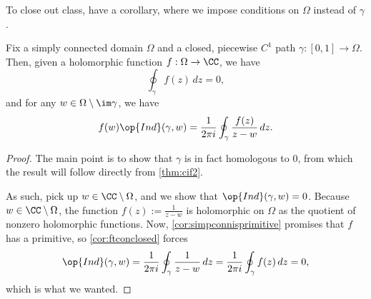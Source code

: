 To close out class, have a corollary, where we impose conditions on $\Omega$ instead of $\gamma$.
\begin{corollary} \label{cor:cifhomotopy}
	Fix a simply connected domain $\Omega$ and a closed, piecewise $C^1$ path $\gamma:[0,1]\to\Omega$. Then, given a holomorphic function $f:\Omega\to\CC$, we have
	\[\oint_\gamma f(z)\,dz=0,\]
	and for any $w\in\Omega\setminus\im\gamma$, we have
	\[f(w)\op{Ind}(\gamma,w)=\frac1{2\pi i}\oint_\gamma\frac{f(z)}{z-w}\,dz.\]
\end{corollary}
\begin{proof}
	The main point is to show that $\gamma$ is in fact homologous to $0$, from which the result will follow directly from \autoref{thm:cif2}.

	As such, pick up $w\in\CC\setminus\Omega$, and we show that $\op{Ind}(\gamma,w)=0$. Because $w\in\CC\setminus\Omega$, the function $f(z):=\frac1{z-w}$ is holomorphic on $\Omega$ as the quotient of nonzero holomorphic functions. Now, \autoref{cor:simpconnisprimitive} promises that $f$ has a primitive, so \autoref{cor:ftconclosed} forces
	\[\op{Ind}(\gamma,w)=\frac1{2\pi i}\oint_\gamma\frac1{z-w}\,dz=\frac1{2\pi i}\oint_\gamma f(z)\,dz=0,\]
	which is what we wanted.
\end{proof}
